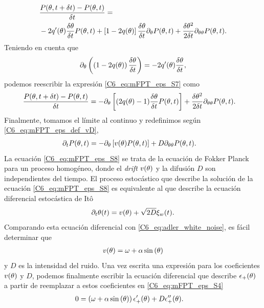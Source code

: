 \documentclass[./main.tex]{subfiles}
\begin{document}
\begin{align}
    & \frac{P( \theta,t + \delta t) - P(\theta,t)}{\delta t}  = \nonumber \\ & - 2 q'(\theta) \frac{\delta\theta}{\delta t} P(\theta,t) + \left[ 1- 2 q(\theta) \right] \frac{\delta\theta}{\delta t} \partial_\theta P(\theta,t) +  \frac{\delta\theta^2}{2 \delta t}\partial_{\theta \theta} P(\theta,t).
    \label{C6_eq:mFPT_eps_S7}
\end{align}
Teniendo en cuenta que 
\begin{align}
    \partial_\theta\left( \left(1-2q(\theta)\right) \frac{\delta\theta}{\delta t} \right) = - 2 q'(\theta) \frac{\delta\theta}{\delta t}, \nonumber
\end{align}
podemos reescribir la expresión \ref{C6_eq:mFPT_eps_S7} como 
\begin{align}
    \frac{P( \theta,t + \delta t)  - P(\theta,t) }{\delta t} &= - \partial_\theta \left[ (2q(\theta)-1) \frac{\delta\theta}{\delta t} P(\theta,t) \right] + \frac{\delta\theta^2}{2 \delta t}\partial_{\theta \theta} P(\theta,t). 
\end{align}
Finalmente, tomamos el límite al continuo y redefinimos según \ref{C6_eq:mFPT_eps_def_vD}, 
\begin{align}
   \partial_t P(\theta,t) &= - \partial_\theta \left[ v(\theta) P(\theta,t) \right] + D \partial_{\theta \theta} P(\theta,t).
   \label{C6_eq:mFPT_eps_S8}
\end{align}
La ecuación \ref{C6_eq:mFPT_eps_S8} se trata de la ecuación de Fokker Planck para un proceso homogéneo, donde el \textit{drift} $v(\theta)$ y la difusión $D$ son independientes del tiempo. El proceso estocástico que describe la solución de la ecuación \ref{C6_eq:mFPT_eps_S8} es equivalente al que describe la ecuación diferencial estocástica de Itô \cite{Gardiner}
\begin{equation}
    \partial_t  \theta(t) =  v(\theta) + \sqrt{2D} \xi_w(t).
\end{equation}
Comparando esta ecuación diferencial con \ref{C6_eq:adler_white_noise}, es fácil determinar que 
\begin{align}
    v(\theta) = \omega + \alpha \sin{(\ensuremath{\theta})}  \label{C6_eq:mFPT_eps_def_vD_solved}
\end{align}
y $D$ es la intensidad del ruido. Una vez escrita una expresión para los coeficientes $v(\theta)$ y $D$, podemos finalmente escribir la ecuación diferencial que describe $\epsilon_{+}(\theta)$ a partir de reemplazar a estos coeficientes en \ref{C6_eq:mFPT_eps_S4}
\begin{align}
     0 &=  \left(\omega + \alpha \sin{(\ensuremath{\theta})}\right) \epsilon_{+}'(\theta) + D \epsilon_{+}''(\theta) .
     \label{C6_eq:mFPT_eps_eq_res}
\end{align}
\end{document}
